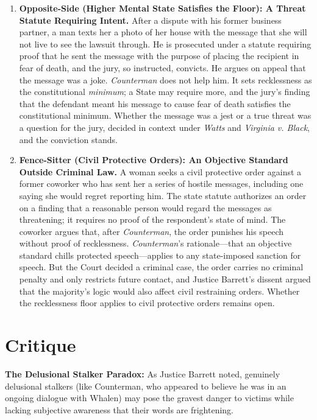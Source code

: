 \documentclass[12pt]{article}
\begin{document}
\begin{enumerate}
\item \textbf{Opposite-Side (Higher Mental State Satisfies the Floor): A Threat Statute Requiring Intent.} After a dispute with his former business partner, a man texts her a photo of her house with the message that she will not live to see the lawsuit through. He is prosecuted under a statute requiring proof that he sent the message with the purpose of placing the recipient in fear of death, and the jury, so instructed, convicts. He argues on appeal that the message was a joke. \textit{Counterman} does not help him. It sets recklessness as the constitutional \emph{minimum}; a State may require more, and the jury's finding that the defendant meant his message to cause fear of death satisfies the constitutional minimum. Whether the message was a jest or a true threat was a question for the jury, decided in context under \textit{Watts} and \textit{Virginia v. Black}, and the conviction stands.

\item \textbf{Fence-Sitter (Civil Protective Orders): An Objective Standard Outside Criminal Law.} A woman seeks a civil protective order against a former coworker who has sent her a series of hostile messages, including one saying she would regret reporting him. The state statute authorizes an order on a finding that a reasonable person would regard the messages as threatening; it requires no proof of the respondent's state of mind. The coworker argues that, after \textit{Counterman}, the order punishes his speech without proof of recklessness. \textit{Counterman}'s rationale---that an objective standard chills protected speech---applies to any state-imposed sanction for speech. But the Court decided a criminal case, the order carries no criminal penalty and only restricts future contact, and Justice Barrett's dissent argued that the majority's logic would also affect civil restraining orders. Whether the recklessness floor applies to civil protective orders remains open.

\end{enumerate}

\section{Critique}
\textbf{The Delusional Stalker Paradox:} As Justice Barrett noted, genuinely delusional stalkers (like Counterman, who appeared to believe he was in an ongoing dialogue with Whalen) may pose the gravest danger to victims while lacking subjective awareness that their words are frightening.
\end{document}
